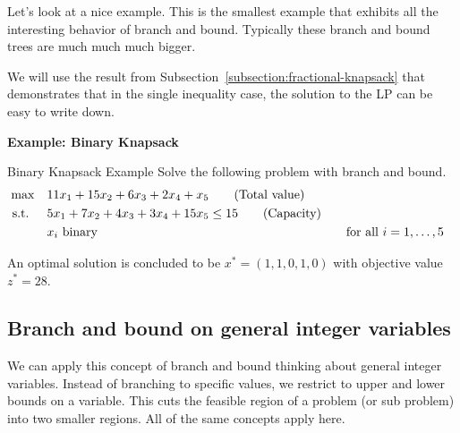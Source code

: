 Let's look at a nice example.  This is the smallest example that exhibits all the interesting behavior of branch and bound.  Typically these branch and bound trees are much much much bigger.

We will use the result from Subsection~\ref{subsection:fractional-knapsack} that demonstrates that in the single inequality case, the solution to the LP can be easy to write down.

\textbf{Example: Binary Knapsack}
\begin{example}{Binary Knapsack Example}{}
Solve the following problem with branch and bound.
\begin{align*}
\max \quad & 11x_1+15x_2+6x_3+2x_4 + x_5   \tag{Total value}\\
\mbox{ s.t. } \quad  & 5x_1+7x_2+4x_3+3x_4 + 15x_5 \leq 15   \tag{Capacity}\\
           & x_i \mbox{ binary} &&\quad \mbox{for all } i=1,\dots,5
\end{align*}



An optimal solution is concluded to be $x^* = (1,1,0,1,0)$ with objective value $z^* = 28$.

\end{example}
\subsection{Branch and bound on general integer variables}
\label{subsec:bb-general-integers}

We can apply this concept of branch and bound thinking about general integer variables.  Instead of branching to specific values, we restrict to upper and lower bounds on a variable.  This cuts the feasible region of a problem (or sub problem) into two smaller regions.  All of the same concepts apply here.

